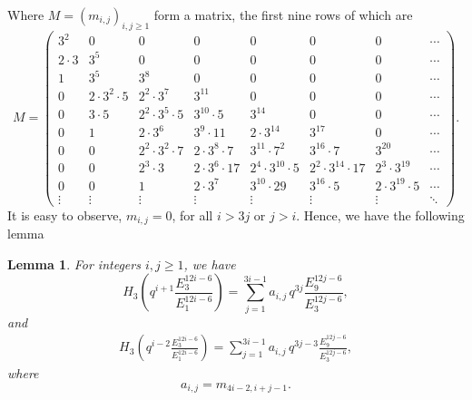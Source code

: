 \documentclass[11pt,a4paper]{article}
\numberwithin{equation}{section}
\theoremstyle{plain}
\newtheorem{lemma}[theorem]{Lemma}
\begin{document}
\noindent	Where $M=(m_{i,j})_{i,j\geq1}$ form a matrix, the first nine rows of which are
\[
M =
\begin{pmatrix}
	3^{2} & 0 & 0 & 0 & 0 & 0 & 0 & \cdots \\
	
	2\cdot 3 & 3^{5} & 0 & 0 & 0 & 0 & 0 & \cdots \\
	
	1 & 3^{5} & 3^{8} & 0 & 0 & 0 & 0 & \cdots \\
	
	0 & 2\cdot 3^{2}\cdot 5 & 2^{2}\cdot 3^{7} & 3^{11} & 0 & 0 & 0 & \cdots \\
	
	0 & 3\cdot 5 & 2^{2}\cdot 3^{5}\cdot 5 & 3^{10}\cdot 5 & 3^{14} & 0 & 0 & \cdots \\
	
	0 & 1 & 2\cdot 3^{6} & 3^{9}\cdot 11 & 2\cdot 3^{14} & 3^{17} & 0 & \cdots \\
	
	0 & 0 & 2^{2}\cdot 3^{2}\cdot 7 & 2\cdot 3^{8}\cdot 7 & 3^{11}\cdot 7^{2} & 3^{16}\cdot 7 & 3^{20} & \cdots \\
	
	0 & 0 & 2^{3}\cdot 3 & 2\cdot 3^{6}\cdot 17 & 2^{4}\cdot 3^{10}\cdot 5 & 2^{2}\cdot 3^{14}\cdot 17 & 2^{3}\cdot 3^{19} & \cdots \\
	
	0 & 0 & 1 & 2\cdot 3^{7} & 3^{10}\cdot 29 & 3^{16}\cdot 5 & 2\cdot 3^{19}\cdot 5 & \cdots \\
	
	\vdots & \vdots & \vdots & \vdots & \vdots & \vdots & \vdots & \ddots
\end{pmatrix}.\]
It is easy to observe, $m_{i,j}=0$, for all $i>3j$ or $j>i$. Hence, we have the following lemma
\begin{lemma}
	For integers $i,j \geq 1$, we have
	\begin{equation}\label{L11}
		H_{3}\!\left(q^{i+1}\frac{E_{3}^{12i-6}}{E_{1}^{12i-6}}\right)=
\sum_{j=1}^{3i-1} a_{i,j}\,
		q^{3j}\frac{E_{9}^{12j-6}}{E_{3}^{12j-6}},
	\end{equation}
	and
	\begin{align}\label{L12}
			H_{3}\!\left(q^{i-2}\frac{E_{3}^{12i-6}}{E_{1}^{12i-6}}\right)=
		\sum_{j=1}^{3i-1} a_{i,j}\,
		q^{3j-3}\frac{E_{9}^{12j-6}}{E_{3}^{12j-6}},
	\end{align}
	where
	\begin{equation*}
		a_{i,j}=m_{4i-2,i+j-1}.
	\end{equation*}
\end{lemma}
\end{document}
